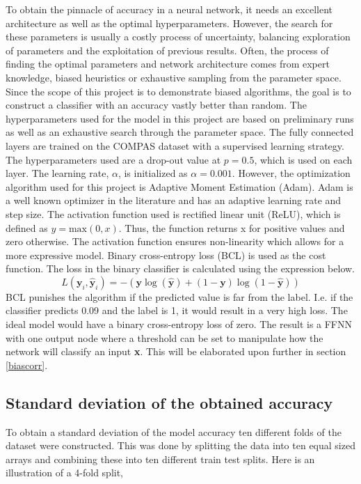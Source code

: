 \documentclass[11pt, fleqn, titlepage]{article}
\begin{document}
	\noindent 
	To obtain the pinnacle of accuracy in a neural network, it needs an excellent architecture as well as the optimal hyperparameters. However, the search for these parameters is usually a costly process of uncertainty, balancing exploration of parameters and the exploitation of previous results. Often, the process of finding the optimal parameters and network architecture comes from expert knowledge, biased heuristics or exhaustive sampling from the parameter space. Since the scope of this project is to demonstrate biased algorithms, the goal is to construct a classifier with an accuracy vastly better than random. The hyperparameters used for the model in this project are based on preliminary runs as well as an exhaustive search through the parameter space. The fully connected layers are trained on the COMPAS dataset with a supervised learning strategy. The hyperparameters used are a drop-out value at $p=0.5$, which is used on each layer. The learning rate, $\alpha$, is initialized as $\alpha = 0.001$. However, the optimization algorithm used for this project is Adaptive Moment Estimation (Adam). Adam is a well known optimizer in the literature and has an adaptive learning rate and step size. The activation function used is rectified linear unit (ReLU), which is defined as $ y = \text{max}(0,x) $. Thus, the function returns x for positive values and zero otherwise. The activation function ensures non-linearity which allows for a more expressive model. Binary cross-entropy loss (BCL) is used as the cost function. The loss in the binary classifier is calculated using the expression below. 
	\begin{equation}\label{key}
	L\left(\boldsymbol{y}_{i}, \hat{\boldsymbol{y}}_{i}\right) = -(\mathbf y \log (\mathbf {\hat y})+(1-\mathbf  y) \log (1-\mathbf {\hat y}))
	\end{equation}
	BCL punishes the algorithm if the predicted value is far from the label. I.e. if the classifier predicts 0.09 and the label is 1, it would result in a very high loss. The ideal model would have a binary cross-entropy loss of zero. \cite {dl} The result is a FFNN with one output node where a threshold can be set to manipulate how the network will classify an input \textbf{x}. This will be elaborated upon further in section \ref{biascorr}.

	\subsection{Standard deviation of the obtained accuracy} \label{standard_deviation}
	To obtain a standard deviation of the model accuracy ten different folds of the dataset were constructed. This was done by splitting the data into ten equal sized arrays and combining these into ten different train test splits. Here is an illustration of a 4-fold split, 
	
\end{document}
